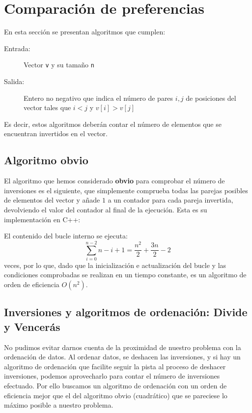 \section{Comparación de preferencias}

En esta sección se presentan algoritmos que cumplen:
\begin{description}
	\item[Entrada:] Vector \texttt{v} y su tamaño \texttt{n}
	\item[Salida:] Entero no negativo que indica el número de pares $i,j$ de posiciones del vector tales que $i < j$ y $v[i] > v[j]$
\end{description}

Es decir, estos algoritmos deberán contar el número de elementos que se encuentran invertidos en el vector.

\subsection{Algoritmo obvio}

El algoritmo que hemos considerado \textbf{obvio} para comprobar el número de inversiones es el siguiente, que simplemente comprueba todas las parejas posibles de elementos del vector y añade $1$ a un contador para cada pareja invertida, devolviendo el valor del contador al final de la ejecución. Esta es su implementación en C++:



El contenido del bucle interno se ejecuta:
\[\sum_{i=0}^{n-2} n-i+1 = \frac{n^2}{2}+\frac{3n}{2}-2\]
veces, por lo que, dado que la inicialización e actualización del bucle y las condiciones comprobadas se realizan en un tiempo constante, es un algoritmo de orden de eficiencia $O(n^2)$.

\subsection{Inversiones y algoritmos de ordenación: Divide y Vencerás}

No pudimos evitar darnos cuenta de la proximidad de nuestro problema con la ordenación de datos. Al ordenar datos, se deshacen las inversiones, y si hay un algoritmo de ordenación que facilite seguir la pista al proceso de deshacer inversiones, podemos aprovecharlo para contar el número de inversiones efectuado.
Por ello buscamos un algoritmo de ordenación con un orden de eficiencia mejor que el del algoritmo obvio (cuadrático) que se pareciese lo máximo posible a nuestro problema.


